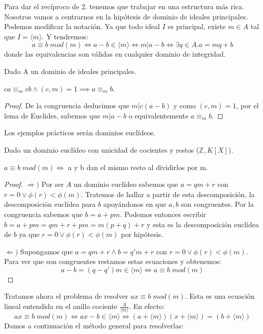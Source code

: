 Para dar el recíproco de 2. tenemos que trabajar en una estructura más rica.  Nosotros vamos a centrarnos en la hipótesis de dominio de ideales principales. Podemos modificar la notación. Ya que todo ideal $I$ es principal, existe $m \in A$ tal que $I = \langle m \rangle$. Y tendremos: $$a \equiv b \; mod(m) \iff a-b \in \langle m \rangle \iff m | a-b \iff \exists q \in A. a = mq+b$$ donde las equivalencias son válidas en cualquier dominio de integridad. 

\begin{proposition}
	Dado A un dominio de ideales principales. 
	
	$ca \equiv_{m} cb \land (c,m) = 1 \implies a \equiv_{m} b$.
\end{proposition}
\begin{proof}
	De la congruencia deducimos que $m|c(a-b)$ y como $(c,m) = 1$, por el lema de Euclides, sabemos que $m|a-b$ o equivalentemente $a \equiv_{m} b$. 
\end{proof}

Los ejemplos prácticos serán dominios euclídeos. 

\begin{proposition}
Dado un dominio euclídeo con unicidad de cocientes y restos ($\mathbb{Z}, K[X]$).

$a \equiv b \; mod(m) \iff$ a y b dan el mismo resto al dividirlos por m.

\end{proposition}
\begin{proof}
$\Rightarrow)$ Por ser $A$ un dominio euclídeo sabemos que $a = qm+r$ con $r = 0 \lor \phi(r) < \phi(m)$. Tratemos de hallar a partir de esta descomposición, la descomposición euclídea para $b$ apoyándonos en que $a,b$ son congruentes. Por la congruencia sabemos que $b = a + pm$. Podemos entonces escribir $b = a + pm = qm + r + pm = m(p+q)+r$ y esta es la descomposición euclídea de $b$ ya que $r = 0 \lor \phi(r) < \phi(m)$ por hipótesis. 

$\Leftarrow)$ Supongamos que $a = qm+r \land b = q'm+r$ con $r = 0 \lor \phi(r) < \phi(m)$. Para ver que son congruentes restamos estas ecuaciones y obtenemos: $$a-b = (q-q')m \in \langle m \rangle \iff a \equiv b \; mod(m)$$
\end{proof}

Tratamos ahora el problema de resolver $ax \equiv b \; mod(m)$. Esta es una ecuación lineal entendida en el anillo cociente $\frac{A}{\langle m \rangle}$. En efecto: $$ax \equiv b \; mod(m) \iff ax-b \in \langle m \rangle \iff (a+\langle m \rangle)(x+\langle m \rangle) = (b+\langle m \rangle)$$ Damos a continuación el método general para resolverlas:

